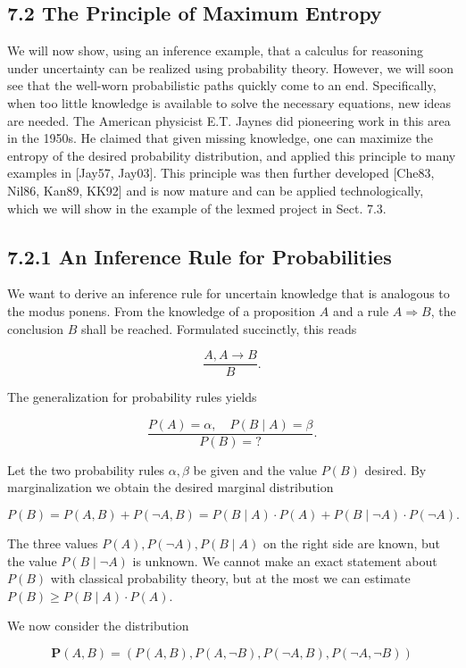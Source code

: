 \documentclass[10pt]{book}
\begin{document}
\begin{center}
\begin{enumerate}
\subsection*{7.2 The Principle of Maximum Entropy}
We will now show, using an inference example, that a calculus for reasoning under uncertainty can be realized using probability theory. However, we will soon see that the well-worn probabilistic paths quickly come to an end. Specifically, when too little knowledge is available to solve the necessary equations, new ideas are needed. The American physicist E.T. Jaynes did pioneering work in this area in the 1950s. He claimed that given missing knowledge, one can maximize the entropy of the desired probability distribution, and applied this principle to many examples in [Jay57, Jay03]. This principle was then further developed [Che83, Nil86, Kan89, KK92] and is now mature and can be applied technologically, which we will show in the example of the lexmed project in Sect. 7.3.

\subsection*{7.2.1 An Inference Rule for Probabilities}
We want to derive an inference rule for uncertain knowledge that is analogous to the modus ponens. From the knowledge of a proposition $A$ and a rule $A \Rightarrow B$, the conclusion $B$ shall be reached. Formulated succinctly, this reads

$$
\frac{A, A \rightarrow B}{B} .
$$

The generalization for probability rules yields


$$
\frac{P(A)=\alpha, \quad P(B \mid A)=\beta}{P(B)=?} .
$$

Let the two probability rules $\alpha, \beta$ be given and the value $P(B)$ desired. By marginalization we obtain the desired marginal distribution

$$
P(B)=P(A, B)+P(\neg A, B)=P(B \mid A) \cdot P(A)+P(B \mid \neg A) \cdot P(\neg A) .
$$

The three values $P(A), P(\neg A), P(B \mid A)$ on the right side are known, but the value $P(B \mid \neg A)$ is unknown. We cannot make an exact statement about $P(B)$ with classical probability theory, but at the most we can estimate $P(B) \geq P(B \mid A) \cdot P(A)$.

We now consider the distribution

$$
\boldsymbol{P}(A, B)=(P(A, B), P(A, \neg B), P(\neg A, B), P(\neg A, \neg B))
$$


\end{enumerate}
\end{center}
\end{document}
